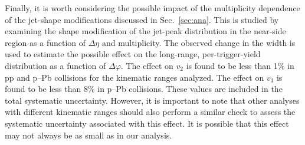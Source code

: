 Finally, it is worth considering the possible impact of the multiplicity dependence of the jet-shape modifications discussed in Sec.~\ref{sec:ana}. This is studied by examining the shape modification of the jet-peak distribution in the near-side region as a function of $\Delta\eta$ and multiplicity. The observed change in the width is used to estimate the possible effect on the long-range, per-trigger-yield distribution as a function of $\Delta\varphi$. The effect on $v_2$ is found to be less than 1$\%$ in pp and p--Pb collisions for the kinematic ranges analyzed. The effect on $v_3$ is found to be less than 8\% in p--Pb collisions. These values are included in the total systematic uncertainty. However, it is important to note that other analyses with different kinematic ranges should also perform a similar check to assess the systematic uncertainty associated with this effect. It is possible that this effect may not always be as small as in our analysis.



